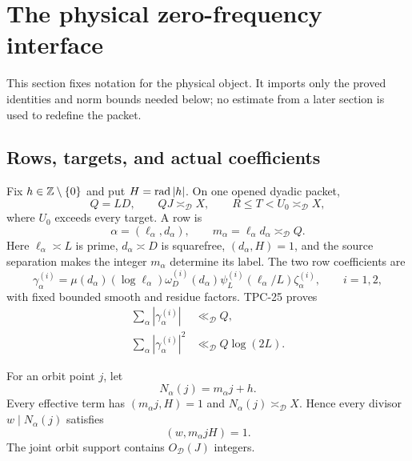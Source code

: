 \section{The physical zero-frequency interface}
\label{sec:tpc33-physical-interface}

This section fixes notation for the physical object.  It imports only the
proved identities and norm bounds needed below; no estimate from a later
section is used to redefine the packet.

\subsection{Rows, targets, and actual coefficients}

Fix \(h\in\mathbb Z\setminus\{0\}\) and put \(H=\operatorname{rad}|h|\).  On one opened
dyadic packet,
\begin{equation}
 Q=LD,\qquad QJ\asymp_{\mathscr D}X,\qquad
 R\le T<U_0\asymp_{\mathscr D}X,
 \label{eq:tpc33-physical-scales}
\end{equation}
where \(U_0\) exceeds every target.  A row is
\begin{equation}
 \alpha=(\ell_\alpha,d_\alpha),\qquad
 m_\alpha=\ell_\alpha d_\alpha\asymp_{\mathscr D}Q.
 \label{eq:tpc33-row-index}
\end{equation}
Here \(\ell_\alpha\asymp L\) is prime, \(d_\alpha\asymp D\) is
squarefree, \((d_\alpha,H)=1\), and the source separation makes the integer
\(m_\alpha\) determine its label.  The two row coefficients are
\begin{equation}
 \gamma_\alpha^{(i)}
 =\mu(d_\alpha)(\log\ell_\alpha)
  \omega_D^{(i)}(d_\alpha)
  \psi_L^{(i)}(\ell_\alpha/L)\zeta_\alpha^{(i)},
 \qquad i=1,2,
 \label{eq:tpc33-row-coefficients}
\end{equation}
with fixed bounded smooth and residue factors.  TPC-25 proves
\begin{align}
 \sum_\alpha|\gamma_\alpha^{(i)}|
 &\ll_{\mathscr D}Q,
 \label{eq:tpc33-row-l1}\\
 \sum_\alpha|\gamma_\alpha^{(i)}|^2
 &\ll_{\mathscr D}Q\log(2L).
 \label{eq:tpc33-row-l2}
\end{align}

For an orbit point \(j\), let
\begin{equation}
 N_\alpha(j)=m_\alpha j+h.
 \label{eq:tpc33-target}
\end{equation}
Every effective term has \((m_\alpha j,H)=1\) and
\(N_\alpha(j)\asymp_{\mathscr D}X\).  Hence every divisor
\(w\mid N_\alpha(j)\) satisfies
\begin{equation}
 (w,m_\alpha jH)=1.
 \label{eq:tpc33-divisor-primitivity}
\end{equation}
The joint orbit support contains \(O_{\mathscr D}(J)\) integers.

